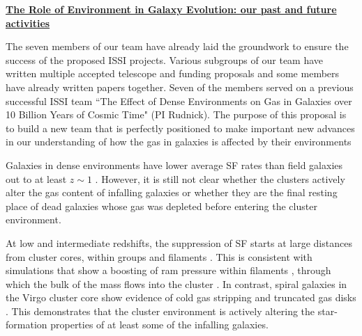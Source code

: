 \documentclass[11pt]{article}
\begin{document}
\newpage

\centerline{{\bf \underline{ The Role of Environment in Galaxy Evolution: our past and future activities}}}
\medskip

The seven members of our team have already laid the groundwork to ensure the success of the proposed ISSI projects.  Various subgroups of our team have written multiple accepted telescope and funding proposals and some members have already written papers together.  Seven of the members served on a previous successful ISSI team ``The Effect of Dense Environments on Gas in Galaxies over 10 Billion Years of Cosmic Time" (PI Rudnick).  The purpose of this proposal is to build a new team that is perfectly positioned to make important new advances in our understanding of how the gas in galaxies is affected by their environments


 Galaxies in dense environments
have lower average SF rates than field galaxies out
to at least $z \sim 1$ \citep[e.g.][]{Poggianti99,Lewis02,Gomez03,Postman05}.
However, it
is still not clear whether the clusters actively alter the gas content
of infalling galaxies or whether they are the final resting place of
dead galaxies whose gas was depleted before entering the cluster
environment.

At low and intermediate redshifts, the suppression of SF starts at large distances from cluster cores, within groups and filaments \citep{Lewis02,Gomez03,Laigle17}.  This is consistent with simulations that show a boosting of ram pressure within filaments \citep{Bahe13}, through which the bulk of the mass flows into the cluster \citep{Ramachandra15}. In contrast, spiral galaxies
in the Virgo cluster core show evidence of cold gas stripping and truncated
gas disks
\citep{Koopmann98,Koopmann04,Dale01,Crowl05,Chung07}.  This
demonstrates that the cluster environment is actively altering the
star-formation properties of at least some of the infalling galaxies.  
\end{document}

